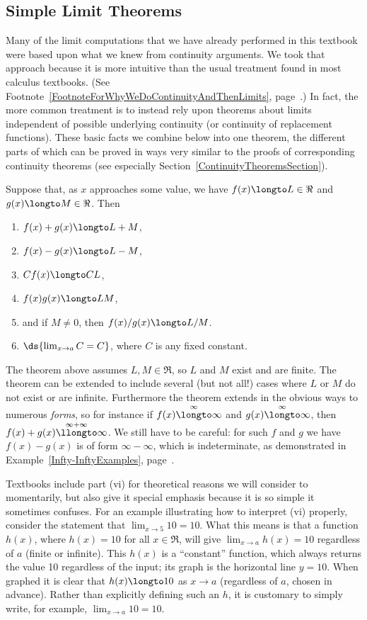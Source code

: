 \subsection{Simple Limit Theorems}
Many of the limit computations that we have already
performed in this textbook were based upon what we knew
from continuity arguments.  We took that approach because
it is more intuitive than the usual treatment found in most
calculus textbooks.  (See 
Footnote~\ref{FootnoteForWhyWeDoContinuityAndThenLimits},
page~\pageref{FootnoteForWhyWeDoContinuityAndThenLimits}.)
In fact, the more  common
treatment is to instead rely upon theorems about
limits independent of possible underlying continuity
(or continuity of replacement functions).
These basic facts we combine below into one theorem,
the different parts of which can be proved
in ways very similar to the proofs of corresponding continuity theorems
(see especially Section~\ref{ContinuityTheoremsSection}).
\begin{theorem}Suppose that, as $x$ approaches some value,
we have $f(x)\longto L\in\Re$ and $g(x)\longto M\in\Re$.
Then
\begin{enumerate}[\rm (i)]
\item $f(x)+g(x)\longto L+M$,
\item $f(x)-g(x)\longto L-M$,
\item $Cf(x)\longto CL$,
\item $f(x)g(x)\longto LM$,
\item and if $M\ne0$, then $f(x)/g(x)\longto L/M$.
\item $\ds{\lim_{x\to a}C=C}$, where $C$ is any fixed constant.
\end{enumerate}
\label{UsualLimitTheorems}
\end{theorem}
The theorem above assumes $L,M\in\Re$, so $L$ and $M$ exist
and are finite.  The theorem can 
be extended to include several (but not all!) cases where
$L$ or $M$ do not exist or are infinite.  Furthermore the theorem
extends in the obvious ways to numerous {\it forms}, so for instance
if $f(x)\overset{\infty}{\longto}\infty$ and 
$g(x)\overset{\infty}{\longto}\infty$, then
$f(x)+g(x)\overset{\infty+\infty}{\llongto}\infty$.  We still
have to be careful: for
such $f$ and $g$ we have
$f(x)-g(x)$ is of form $\infty-\infty$, which is indeterminate,
as demonstrated in Example~\ref{Infty-InftyExamples}, 
page~\pageref{Infty-InftyExamples}.

Textbooks include part (vi) for theoretical reasons we will
consider to momentarily, but also give it special emphasis because
it is so simple it sometimes confuses.  For an example illustrating
how to interpret (vi) properly, 
consider the statement that $\lim_{x\to5}10=10$.
What this means is that a function $h(x)$, where
$h(x)=10$ for all $x\in\Re$,
will give $\lim_{x\to a}h(x)=10$ regardless of $a$ (finite or infinite).
This $h(x)$ is a ``constant''
function, which always returns the value 10 regardless of the
input; its graph is the horizontal line $y=10$.  When graphed it is clear
that $h(x)\longto 10$ as $x\to a$ (regardless of $a$,
chosen in advance).  Rather than explicitly defining such
an $h$, it is customary to simply write, for example,  $\lim_{x\to a}10=10$. 

